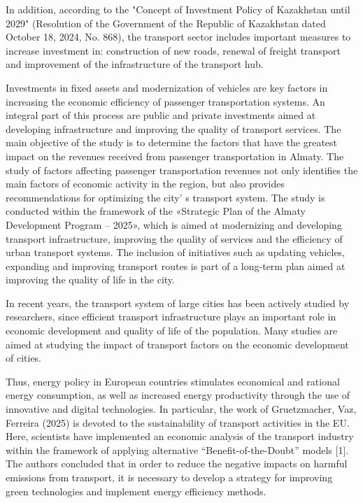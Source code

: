 In addition, according to the "Concept of Investment Policy of
Kazakhstan until 2029" (Resolution of the Government of the Republic of
Kazakhstan dated October 18, 2024, No. 868), the transport sector
includes important measures to increase investment in: construction of
new roads, renewal of freight transport and improvement of the
infrastructure of the transport hub.

Investments in fixed assets and modernization of vehicles are key
factors in increasing the economic efficiency of passenger
transportation systems. An integral part of this process are public and
private investments aimed at developing infrastructure and improving the
quality of transport services. The main objective of the study is to
determine the factors that have the greatest impact on the revenues
received from passenger transportation in Almaty. The study of factors
affecting passenger transportation revenues not only identifies the main
factors of economic activity in the region, but also provides
recommendations for optimizing the city' s transport
system. The study is conducted within the framework of the «Strategic
Plan of the Almaty Development Program -- 2025», which is aimed at
modernizing and developing transport infrastructure, improving the
quality of services and the efficiency of urban transport systems. The
inclusion of initiatives such as updating vehicles, expanding and
improving transport routes is part of a long-term plan aimed at
improving the quality of life in the city.

In recent years, the transport system of large cities has been actively
studied by researchers, since efficient transport infrastructure plays
an important role in economic development and quality of life of the
population. Many studies are aimed at studying the impact of transport
factors on the economic development of cities.

Thus, energy policy in European countries stimulates economical and
rational energy consumption, as well as increased energy productivity
through the use of innovative and digital technologies. In particular,
the work of Gruetzmacher, Vaz, Ferreira (2025) is devoted to the
sustainability of transport activities in the EU. Here, scientists have
implemented an economic analysis of the transport industry within the
framework of applying alternative ``Benefit-of-the-Doubt'' models
{[}1{]}. The authors concluded that in order to reduce the negative
impacts on harmful emissions from transport, it is necessary to develop
a strategy for improving green technologies and implement energy
efficiency methods.

